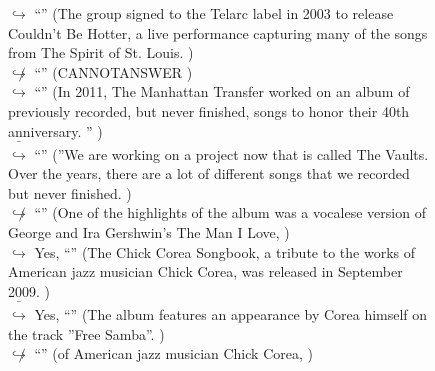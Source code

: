 \documentclass[11pt,a4paper, onecolumn]{article}
\begin{document}
\begin{figure}[t] \small \begin{tcolorbox}[boxsep=0pt,left=5pt,right=0pt,top=2pt,colback = yellow!5] \begin{dialogue}
 \small 
\colorbox{pink!25}{$\hookrightarrow$}
{ ``'' (The group signed to the Telarc label in 2003 to release Couldn't Be Hotter, a live performance capturing many of the songs from The Spirit of St. Louis. ) }
\\
\colorbox{pink!25}{$\not\hookrightarrow$}
{ ``'' (CANNOTANSWER ) }
\\
\colorbox{pink!25}{$\hookrightarrow$}
{ ``'' (In 2011, The Manhattan Transfer worked on an album of previously recorded, but never finished, songs to honor their 40th anniversary. '' ) }
\\
\colorbox{pink!25}{ $\bar{\hookrightarrow}$}
{ ``'' (''We are working on a project now that is called The Vaults. Over the years, there are a lot of different songs that we recorded but never finished. ) }
\\
\colorbox{pink!25}{$\not\hookrightarrow$}
{ ``'' (One of the highlights of the album was a vocalese version of George and Ira Gershwin's The Man I Love, ) }
\\
\colorbox{pink!25}{$\hookrightarrow$}
\colorbox{red!25}{Yes,}
{ ``'' (The Chick Corea Songbook, a tribute to the works of American jazz musician Chick Corea, was released in September 2009. ) }
\\
\colorbox{pink!25}{ $\bar{\hookrightarrow}$}
\colorbox{red!25}{Yes,}
{ ``'' (The album features an appearance by Corea himself on the track ''Free Samba''. ) }
\\
\colorbox{pink!25}{$\not\hookrightarrow$}
{ ``'' (of American jazz musician Chick Corea, ) }
\\
 \end{dialogue}\end{tcolorbox}\end{figure}
\end{document}

